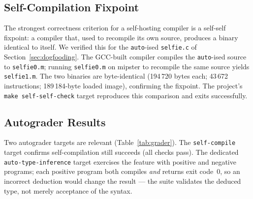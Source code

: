 \documentclass[a4paper,11pt]{article}
\begin{document}
\subsection{Self-Compilation Fixpoint}
\label{sec:fixpoint}

The strongest correctness criterion for a self-hosting compiler is a self-self fixpoint: a compiler that, used to recompile its own source, produces a binary identical to itself. We verified this for the \texttt{auto}-ised \texttt{selfie.c} of Section~\ref{sec:dogfooding}. The GCC-built compiler compiles the \texttt{auto}-ised source to \texttt{selfie0.m}; running \texttt{selfie0.m} on mipster to recompile the same source yields \texttt{selfie1.m}. The two binaries are byte-identical (194\,720 bytes each; 43\,672 instructions; 189\,184-byte loaded image), confirming the fixpoint. The project's \texttt{make self-self-check} target reproduces this comparison and exits successfully.

\subsection{Autograder Results}
\label{sec:autograder}

Two autograder targets are relevant (Table~\ref{tab:grader}). The \texttt{self-compile} target confirms self-compilation still succeeds (all checks pass). The dedicated \texttt{auto-type-inference} target exercises the feature with positive and negative programs; each positive program both compiles \emph{and} returns exit code~0, so an incorrect deduction would change the result --- the suite validates the deduced type, not merely acceptance of the syntax.
\end{document}
